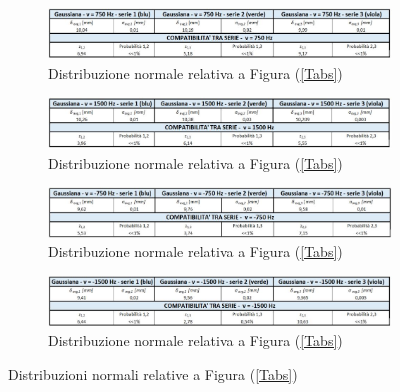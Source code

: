 \documentclass{article}
\begin{document}
\begin{figure}[h]
    \centering
    \begin{subfigure}{\linewidth}
        \centering
        \includegraphics[width=\linewidth]{Coerenza_Gauss1_FIXED.JPG}
        \caption{Distribuzione normale relativa a Figura (\ref{Tabs})}
        \label{Gauss_750}
    \end{subfigure}
    \newline
    \begin{subfigure}{\linewidth}
        \centering
        \includegraphics[width=\linewidth]{Coerenza_Gauss2_FIXED.JPG}
        \caption{Distribuzione normale relativa a Figura (\ref{Tabs})}
        \label{Gauss_1500}  
    \end{subfigure}
    \newline
    \begin{subfigure}{\linewidth}
        \centering
        \includegraphics[width=\linewidth]{Coerenza_Gauss3_FIXED.JPG}
        \caption{Distribuzione normale relativa a Figura (\ref{Tabs})}
        \label{Gauss_-750}     
    \end{subfigure}
    \newline
    \begin{subfigure}{\linewidth}
        \centering
        \includegraphics[width=\linewidth]{Coerenza_Gauss4_FIXED.JPG}
        \caption{Distribuzione normale relativa a Figura (\ref{Tabs})}
        \label{Gauss_-1500}   
    \end{subfigure}
    \caption{Distribuzioni normali relative a Figura (\ref{Tabs})}
    \label{Gauss}
\end{figure}
\end{document}
